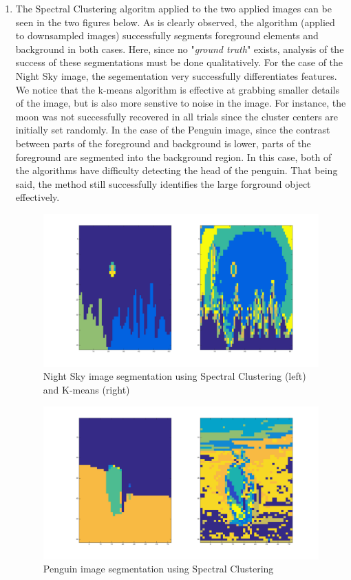 \documentclass[10pt]{article}
\begin{document}
\begin{enumerate}
\begin{enumerate}
\item The Spectral Clustering algoritm applied to the two applied images can be seen in the two figures below. As is clearly observed, the algorithm (applied to downsampled images) successfully segments foreground elements and background in both cases. Here, since no "\emph{ground truth}" exists, analysis of the success of these segmentations must be done qualitatively. For the case of the Night Sky image, the segementation very successfully differentiates features. We notice that the k-means algorithm is effective at grabbing smaller details of the image, but is also more senstive to noise in the image. For instance, the moon was not successfully recovered in all trials since the cluster centers are initially set randomly. In the case of the Penguin image, since the contrast between parts of the foreground and background is lower, parts of the foreground are segmented into the background region. In this case, both of the algorithms have difficulty detecting the head of the penguin. That being said, the method still successfully identifies the large forground object effectively.
\begin{figure}[h!] \includegraphics[scale=0.35]{hw6q1b1.png} \caption[h1]{Night Sky image segmentation using Spectral Clustering (left) and K-means (right)} \end{figure}
\begin{figure}[h!] \includegraphics[scale=0.35]{hw6q1b2.png} \caption[h2]{Penguin image segmentation using Spectral Clustering} \end{figure} \\ \newpage


\end{enumerate}
\end{enumerate}
\end{document}
